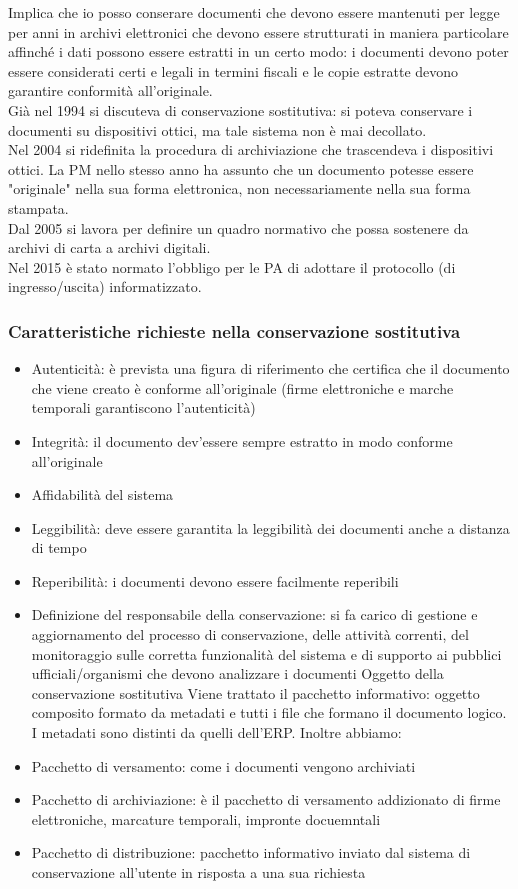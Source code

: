 Implica che io posso conserare documenti che devono essere mantenuti per
legge per anni in archivi elettronici che devono essere strutturati in
maniera particolare affinch\'e i dati possono essere estratti in un certo
modo: i documenti devono poter essere considerati certi e legali in
termini fiscali e le copie estratte devono garantire conformit\`a
all'originale.\\
Gi\`a nel 1994 si discuteva di conservazione sostitutiva: si poteva
conservare i documenti su dispositivi ottici, ma tale sistema non \`e mai
decollato.\\
Nel 2004 si ridefinita la procedura di archiviazione che trascendeva i
dispositivi ottici. La PM nello stesso anno ha assunto che un documento
potesse essere "originale" nella sua forma elettronica, non
necessariamente nella sua forma stampata.\\
Dal 2005 si lavora per definire un quadro normativo che possa sostenere
da archivi di carta a archivi digitali.\\
Nel 2015 \`e stato normato l'obbligo per le PA di adottare il protocollo
(di ingresso/uscita) informatizzato.

\subsubsection{Caratteristiche richieste nella conservazione
sostitutiva}

\begin{itemize}
\item
  Autenticit\`a: \`e prevista una figura di riferimento che certifica che il
  documento che viene creato \`e conforme all'originale (firme
  elettroniche e marche temporali garantiscono l'autenticit\`a)
\item
  Integrit\`a: il documento dev'essere sempre estratto in modo conforme
  all'originale
\item
  Affidabilit\`a del sistema
\item
  Leggibilit\`a: deve essere garantita la leggibilit\`a dei documenti anche
  a distanza di tempo
\item
  Reperibilit\`a: i documenti devono essere facilmente reperibili
\item
  Definizione del responsabile della conservazione: si fa carico di
  gestione e aggiornamento del processo di conservazione, delle attivit\`a
  correnti, del monitoraggio sulle corretta funzionalit\`a del sistema e
  di supporto ai pubblici ufficiali/organismi che devono analizzare i
  documenti Oggetto della conservazione sostitutiva Viene trattato il
  pacchetto informativo: oggetto composito formato da metadati e tutti i
  file che formano il documento logico. I metadati sono distinti da
  quelli dell'ERP. Inoltre abbiamo:
\item
  Pacchetto di versamento: come i documenti vengono archiviati
\item
  Pacchetto di archiviazione: \`e il pacchetto di versamento addizionato
  di firme elettroniche, marcature temporali, impronte docuemntali
\item
  Pacchetto di distribuzione: pacchetto informativo inviato dal sistema
  di conservazione all'utente in risposta a una sua richiesta
\end{itemize}

